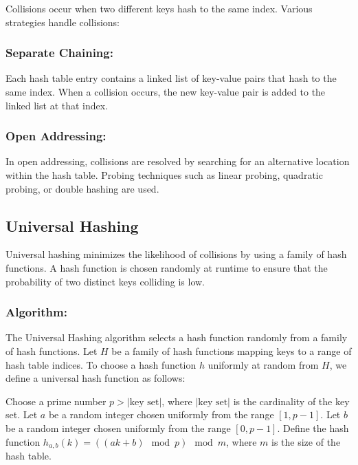 \documentclass[12pt]{book} %
\begin{document}
Collisions occur when two different keys hash to the same index. Various strategies handle collisions:

\subsubsection{Separate Chaining:}
Each hash table entry contains a linked list of key-value pairs that hash to the same index. When a collision occurs, the new key-value pair is added to the linked list at that index.

\subsubsection{Open Addressing:}
In open addressing, collisions are resolved by searching for an alternative location within the hash table. Probing techniques such as linear probing, quadratic probing, or double hashing are used.

\subsection{Universal Hashing}

Universal hashing minimizes the likelihood of collisions by using a family of hash functions. A hash function is chosen randomly at runtime to ensure that the probability of two distinct keys colliding is low.


\subsubsection{Algorithm:}
The Universal Hashing algorithm selects a hash function randomly from a family of hash functions. Let \(H\) be a family of hash functions mapping keys to a range of hash table indices. To choose a hash function \(h\) uniformly at random from \(H\), we define a universal hash function as follows:
\FloatBarrier
\begin{algorithm}[H]
\caption{Universal Hashing}
\begin{algorithmic}[1]
\State Choose a prime number \(p > |\text{key set}|\), where \(|\text{key set}|\) is the cardinality of the key set.
\State Let \(a\) be a random integer chosen uniformly from the range \([1, p-1]\).
\State Let \(b\) be a random integer chosen uniformly from the range \([0, p-1]\).
\State Define the hash function \(h_{a,b}(k) = ((ak + b) \mod p) \mod m\), where \(m\) is the size of the hash table.
\end{algorithmic}
\end{algorithm}
\FloatBarrier
\end{document}
